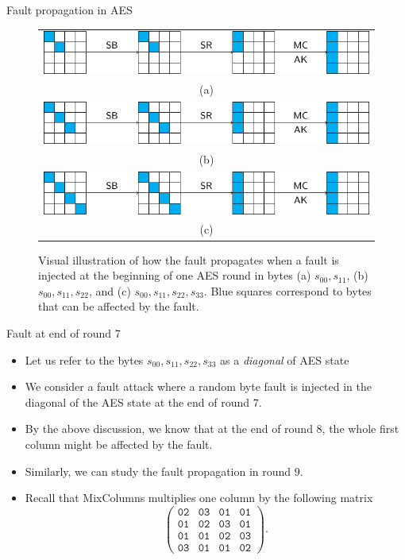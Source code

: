 \begin{frame}{Fault propagation in AES}
    \begin{figure}
    \centering
    \begin{tabular}{c}
    \includegraphics{fig/AES_Fault_Diagnol_Attack_Round8_11.pdf} \\
    (a)\\
    \includegraphics{fig/AES_Fault_Diagnol_Attack_Round8_22.pdf} \\
    (b)\\
    \includegraphics{fig/AES_Fault_Diagnol_Attack_Round8_33.pdf} \\
    (c)
    \end{tabular}
    \caption{Visual illustration of how the fault propagates when a fault is injected at the beginning of one AES round in bytes (a) $s_{00}, s_{11}$, (b) $s_{00}, s_{11}, s_{22}$, and (c) $s_{00}, s_{11}, s_{22}, s_{33}$.
    Blue squares correspond to bytes that can be affected by the fault.}
\end{figure}
\end{frame}

\begin{frame}{Fault at end of round 7}
    \begin{itemize}
        \item Let us refer to the bytes $s_{00}, s_{11}, s_{22}, s_{33}$ as a \textit{diagonal} of AES state
        \item We consider a fault attack where a random byte fault is injected in the diagonal of the AES state at the end of round $7$.
        \item By the above discussion, we know that at the end of round $8$, the whole first column might be affected by the fault.
        \item Similarly, we can study the fault propagation in round $9$.
        \item Recall that MixColumns multiplies one column by the following matrix
\[
\begin{pmatrix}
    \texttt{02} & \texttt{03} & \texttt{01} & \texttt{01} \\
    \texttt{01} & \texttt{02} & \texttt{03} & \texttt{01} \\
    \texttt{01} & \texttt{01} & \texttt{02} & \texttt{03} \\
    \texttt{03} & \texttt{01} & \texttt{01} & \texttt{02}
    \end{pmatrix}.
\]
    \end{itemize}
\end{frame}

